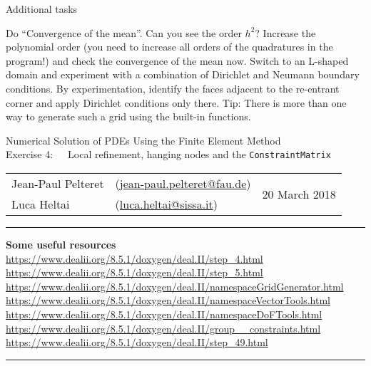 \documentclass[11pt,answers]{exam}
\makeatletter
\newcommand{\makeheader}[3]{%
\setcounter{question}{0}
\begin{center}
{\sc Numerical Solution of PDEs Using the Finite Element Method}\vspace{2ex}\\
{\sc Exercise #1:\ \ \ #2}\vspace{2ex}\\
\begin{tabular*}{\textwidth}{ll @{\extracolsep{\fill}}r}
Jean-Paul Pelteret & (\url{jean-paul.pelteret@fau.de}) & \multirow{2}{*}{#3} \\
Luca Heltai & (\url{luca.heltai@sissa.it}) & \\
\end{tabular*}
\end{center}
}
\newcommand{\makeresources}[1]{%
\rule{\textwidth}{0.6mm}
\textbf{Some useful resources}\\[1.5ex]
#1 \par
\rule{\textwidth}{0.6mm}
}
\makeatother
\begin{document}
\begin{questions}

\question Additional tasks
\begin{parts}
\bonuspart Do ``Convergence of the mean''. Can you see the order $h^{2}$? 
\bonuspart Increase the polynomial order (you need to increase all orders of the quadratures in the program!) and check the convergence of the mean now.
\bonuspart Switch to an L-shaped domain and experiment with a combination of Dirichlet and Neumann boundary conditions. 
By experimentation, identify the faces adjacent to the re-entrant corner and apply Dirichlet conditions only there.
Tip: There is more than one way to generate such a grid using the built-in functions. 
\end{parts}

\end{questions}




\clearpage
\makeheader{4}{Local refinement, hanging nodes and the \texttt{ConstraintMatrix}}{20 March 2018}
\makeresources{%
\url{https://www.dealii.org/8.5.1/doxygen/deal.II/step_4.html} \\
\url{https://www.dealii.org/8.5.1/doxygen/deal.II/step_5.html} \\
\url{https://www.dealii.org/8.5.1/doxygen/deal.II/namespaceGridGenerator.html} \\
\url{https://www.dealii.org/8.5.1/doxygen/deal.II/namespaceVectorTools.html} \\
\url{https://www.dealii.org/8.5.1/doxygen/deal.II/namespaceDoFTools.html} \\
\url{https://www.dealii.org/8.5.1/doxygen/deal.II/group__constraints.html} \\
\url{https://www.dealii.org/8.5.1/doxygen/deal.II/step_49.html}
}
\end{document}
